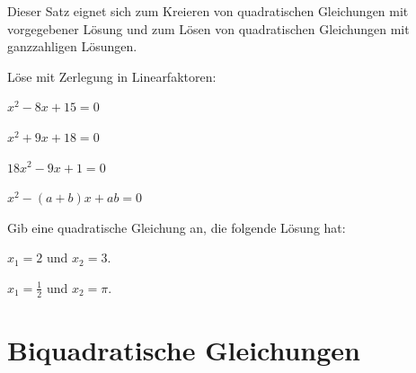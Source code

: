 \documentclass[%
11pt,%
twoside,%
titlepage,%
german,%
headsepline%
]{scrartcl}
\begin{document}
\begin{bem}
  Dieser Satz eignet sich zum Kreieren von quadratischen
  Gleichungen mit vorgegebener L\"osung und zum L\"osen von
  quadratischen Gleichungen mit ganzzahligen L\"osungen.
\end{bem}

\begin{ueb}
  L\"ose mit Zerlegung in Linearfaktoren:\\[2ex]
  \begin{minipage}{0.49\textwidth}
    \begin{enumeratea}
      \item $x^2-8x+15=0$
      \item $x^2+9x+18=0$\\[1ex]
    \end{enumeratea}
  \end{minipage}
  \begin{minipage}{0.49\textwidth}
    \begin{enumeratea}\addtocounter{enumi}{2}
      \item $18x^2-9x+1=0$
      \item $x^2-(a+b)x+ab=0$\\[1ex]
    \end{enumeratea}
  \end{minipage}
\end{ueb}

\begin{ueb}
  Gib eine quadratische Gleichung an, die folgende L\"osung hat:\\[2ex]
  \begin{minipage}{0.49\textwidth}
    \begin{enumeratea}
      \item $x_1=2$ und $x_2=3$.
    \end{enumeratea}
  \end{minipage}
  \begin{minipage}{0.49\textwidth}
    \begin{enumeratea}\addtocounter{enumi}{1}
      \item $x_1=\frac{1}{2}$ und $x_2=\pi$.
    \end{enumeratea}
  \end{minipage}
\end{ueb}

\section{Biquadratische Gleichungen}
\end{document}

